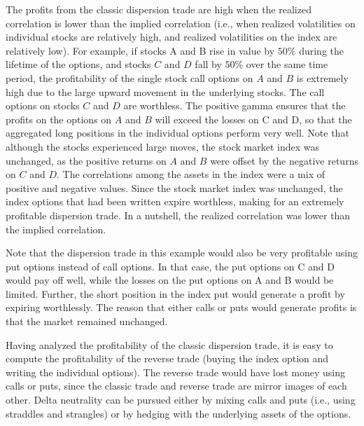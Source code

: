 \documentclass[11pt]{article}
\begin{document}
The profits from the classic dispersion trade are high when the realized correlation is lower than the implied correlation (i.e., when realized volatilities on individual stocks are relatively high, and realized volatilities on the index are relatively low). For example, if stocks A and B rise in value by $50 \%$ during the lifetime of the options, and stocks $C$ and $D$ fall by $50 \%$ over the same time period, the profitability of the single stock call options on $A$ and $B$ is extremely high due to the large upward movement in the underlying stocks. The call options on stocks $C$ and $D$ are worthless. The positive gamma ensures that the profits on the options on $A$ and $B$ will exceed the losses on C and D, so that the aggregated long positions in the individual options perform very well. Note that although the stocks experienced large moves, the stock market index was unchanged, as the positive returns on $A$ and $B$ were offset by the negative returns on $C$ and $D$. The correlations among the assets in the index were a mix of positive and negative values. Since the stock market index was unchanged, the index options that had been written expire worthless, making for an extremely profitable dispersion trade. In a nutshell, the realized correlation was lower than the implied correlation.

Note that the dispersion trade in this example would also be very profitable using put options instead of call options. In that case, the put options on C and D would pay off well, while the losses on the put options on A and B would be limited. Further, the short position in the index put would generate a profit by expiring worthlessly. The reason that either calls or puts would generate profits is that the market remained unchanged.

Having analyzed the profitability of the classic dispersion trade, it is easy to compute the profitability of the reverse trade (buying the index option and writing the individual options). The reverse trade would have lost money using calls or puts, since the classic trade and reverse trade are mirror images of each other. Delta neutrality can be pursued either by mixing calls and puts (i.e., using straddles and strangles) or by hedging with the underlying assets of the options.
\end{document}
